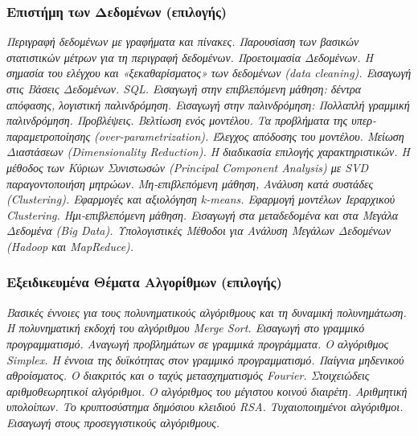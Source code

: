 \hypertarget{ux3b5ux3c0ux3b9ux3c3ux3c4ux3aeux3bcux3b7-ux3c4ux3c9ux3bd-ux3b4ux3b5ux3b4ux3bfux3bcux3adux3bdux3c9ux3bd-ux3b5ux3c0ux3b9ux3bbux3bfux3b3ux3aeux3c2}{%
\subsubsection{Επιστήμη των Δεδομένων
(επιλογής)}\label{ux3b5ux3c0ux3b9ux3c3ux3c4ux3aeux3bcux3b7-ux3c4ux3c9ux3bd-ux3b4ux3b5ux3b4ux3bfux3bcux3adux3bdux3c9ux3bd-ux3b5ux3c0ux3b9ux3bbux3bfux3b3ux3aeux3c2}}

\emph{Περιγραφή δεδομένων με γραφήματα και πίνακες. Παρουσίαση των
βασικών στατιστικών μέτρων για τη περιγραφή δεδομένων. Προετοιμασία
Δεδομένων. Η σημασία του ελέγχου και «ξεκαθαρίσματος» των δεδομένων
(data cleaning). Εισαγωγή στις Βάσεις Δεδομένων. SQL. Εισαγωγή στην
επιβλεπόμενη μάθηση: δέντρα απόφασης, λογιστική παλινδρόμηση. Εισαγωγή
στην παλινδρόμηση: Πολλαπλή γραμμική παλινδρόμηση. Προβλέψεις. Βελτίωση
ενός μοντέλου. Τα προβλήματα της υπερ-παραμετροποίησης
(over-parametrization). Έλεγχος απόδοσης του μοντέλου. Μείωση Διαστάσεων
(Dimensionality Reduction). Η διαδικασία επιλογής χαρακτηριστικών. Η
μέθοδος των Κύριων Συνιστωσών (Principal Component Analysis) με SVD
παραγοντοποιήση μητρώων. Μη-επιβλεπόμενη μάθηση, Ανάλυση κατά συστάδες
(Clustering). Εφαρμογές και αξιολόγηση k-means. Εφαρμογή μοντέλων
Ιεραρχικού Clustering. Ημι-επιβλεπόμενη μάθηση. Εισαγωγή στα
μεταδεδομένα και στα Μεγάλα Δεδομένα (Big Data). Υπολογιστικές Μέθοδοι
για Ανάλυση Μεγάλων Δεδομένων (Hadoop και MapReduce).}

\hypertarget{ux3b5ux3beux3b5ux3b9ux3b4ux3b9ux3baux3b5ux3c5ux3bcux3adux3bdux3b1-ux3b8ux3adux3bcux3b1ux3c4ux3b1-ux3b1ux3bbux3b3ux3bfux3c1ux3afux3b8ux3bcux3c9ux3bd-ux3b5ux3c0ux3b9ux3bbux3bfux3b3ux3aeux3c2}{%
\subsubsection{Εξειδικευμένα Θέματα Αλγορίθμων
(επιλογής)}\label{ux3b5ux3beux3b5ux3b9ux3b4ux3b9ux3baux3b5ux3c5ux3bcux3adux3bdux3b1-ux3b8ux3adux3bcux3b1ux3c4ux3b1-ux3b1ux3bbux3b3ux3bfux3c1ux3afux3b8ux3bcux3c9ux3bd-ux3b5ux3c0ux3b9ux3bbux3bfux3b3ux3aeux3c2}}

\emph{Βασικές έννοιες για τους πολυνηματικούς αλγόριθμους και τη
δυναμική πολυνημάτωση. Η πολυνηματική εκδοχή του αλγόριθμου Merge Sort.
Εισαγωγή στο γραμμικό προγραμματισμό. Αναγωγή προβλημάτων σε γραμμικά
προγράμματα. Ο αλγόριθμος Simplex. Η έννοια της δυϊκότητας στον γραμμικό
προγραμματισμό. Παίγνια μηδενικού αθροίσματος. Ο διακριτός και ο ταχύς
μετασχηματισμός Fourier. Στοιχειώδεις αριθμοθεωρητικοί αλγόριθμοι. Ο
αλγόριθμος του μέγιστου κοινού διαιρέτη. Αριθμητική υπολοίπων. Το
κρυπτοσύστημα δημόσιου κλειδιού RSA. Τυχαιοποιημένοι αλγόριθμοι.
Εισαγωγή στους προσεγγιστικούς αλγόριθμους.}


